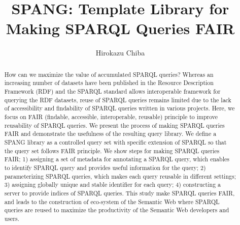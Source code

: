 \documentclass[runningheads]{llncs}
\begin{document}
\title{SPANG: Template Library for Making SPARQL Queries FAIR}
\author{Hirokazu Chiba}
%
\maketitle              %
%
\begin{abstract}
How can we maximize the value of accumulated SPARQL queries? 
Whereas an increasing number of datasets have been published in the Resource Description Framework (RDF) and the SPARQL standard allows interoperable framework for querying the RDF datasets, reuse of SPARQL queries remains limited due to the lack of accessibility and findability of SPARQL queries written in various projects. 
Here, we focus on FAIR (findable, accessible, interoperable,
reusable) principle to improve reusability of SPARQL queries.
We present the process of making SPARQL queries FAIR and demonstrate the usefulness of the resulting query library.
We define a SPANG library as a controlled query set with specific
extension of SPARQL so that the query set follows FAIR principle.
We show steps for making SPARQL queries FAIR;
1) assigning a set of metadata for annotating a SPARQL query, which
enables to identify SPARQL query and provides useful information for the query;
2) parameterizing SPARQL queries, which makes each query reusable in different settings;
3) assigning globally unique and stable identifier for each query;
4) constructing a server to provide indices of SPARQL queries.
This study make SPARQL queries FAIR, and leads to the construction of eco-system of the Semantic Web where SPARQL queries are reused to maximize the productivity of the Semantic Web developers and users.


\end{abstract}
\end{document}
